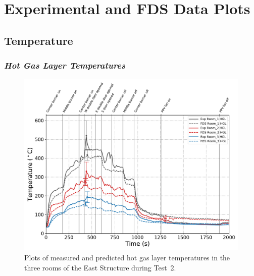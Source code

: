 \appendix
\renewcommand{\thechapter}{B}
\renewcommand{\chaptername}{Appendix}

\chapter{Experimental and FDS Data Plots}
\label{chap:exp_FDS_plots}

\section{Temperature}
\subsection*{\textit{Hot Gas Layer Temperatures}}
\begin{figure}[!h]
	\centering
	\includegraphics[width=\columnwidth]{Figures/Plots/Validation/Temperature/Test_2_HGL}
	\caption[Plots of measured and predicted hot gas layer temperatures during Test~2.]{Plots of measured and predicted hot gas layer temperatures in the three rooms of the East Structure during Test~2.}
	\label{fig:HGL_data_Test2}
\end{figure}


